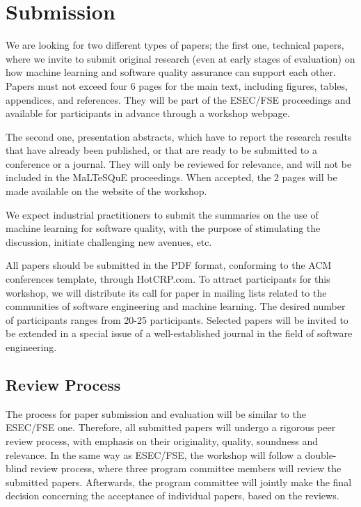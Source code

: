 \section{Submission}
\label{sec:submissions}

We are looking for two different types of papers; the first one, \ie technical papers, where we invite to submit original research (even at early stages of evaluation) on how machine learning and software quality assurance can support each other.
Papers must not exceed four 6 pages for the main text, including figures, tables, appendices, and references.
They will be part of the ESEC/FSE proceedings and available for participants in advance through a workshop webpage.

The second one, \ie presentation abstracts, which have to report the research results that have already been published, or that are ready to be submitted to a conference or a journal.
They will only be reviewed for relevance, and will not be included in the MaLTeSQuE proceedings.
When accepted, the 2 pages will be made available on the website of the workshop.

We expect industrial practitioners to submit the summaries on the use of machine learning for software quality, with the purpose of stimulating the discussion, initiate challenging new avenues, etc.

All papers should be submitted in the PDF format, conforming to the ACM conferences template, through HotCRP.com.
To attract participants for this workshop, we will distribute its call for paper in mailing lists related to the communities of software engineering and machine learning.
The desired number of participants ranges from 20-25 participants.
Selected papers will be invited to be extended in a special issue of a well-established journal in the field of software engineering.

\subsection{Review Process}
The process for paper submission and evaluation will be similar to the ESEC/FSE one.
Therefore, all submitted papers will undergo a rigorous peer review process, with emphasis on their originality, quality, soundness and relevance.
In the same way as ESEC/FSE, the workshop will follow a double-blind review process, where three program committee members will review the submitted papers.
Afterwards, the program committee will jointly make the final decision concerning the acceptance of individual papers, based on the reviews.

